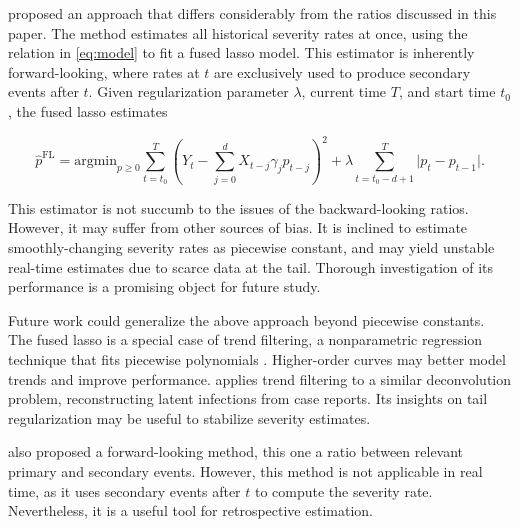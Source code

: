 \documentclass{article}
\renewcommand{\hat}{\widehat} %
\begin{document}

\citet{fusedlasso} proposed an approach that differs considerably from the ratios discussed in this paper. 
The method estimates all historical severity rates at once, using the relation in \eqref{eq:model} to fit a fused lasso model. This estimator is inherently forward-looking, where rates at $t$ are exclusively used to produce secondary events after $t$. Given regularization parameter $\lambda$, current time $T$, and start time $t_0$, the fused lasso estimates

$$\hat{p}^\text{FL} = \text{argmin}_{p \geq 0} \sum_{t=t_0}^T (Y_t-\sum_{j=0}^d X_{t-j}\gamma_j p_{t-j})^2 + \lambda\sum_{t=t_0-d+1}^{T}\lvert p_t - p_{t-1}\rvert.$$

This estimator is not succumb to the issues of the backward-looking ratios. However, it may suffer from other sources of bias. It is inclined to estimate smoothly-changing severity rates as piecewise constant, and may yield unstable real-time estimates due to scarce data at the tail. 
Thorough investigation of its performance is a promising object for future study.

Future work could generalize the above approach beyond piecewise constants. The fused lasso is a special case of trend filtering, a nonparametric regression technique that fits piecewise polynomials \citet{Tibshirani2014}. Higher-order curves may better model trends and improve performance. \citep{Jahja2022} applies trend filtering to a similar deconvolution problem, reconstructing latent infections from case reports. Its insights on tail regularization may be useful to stabilize severity estimates. 

\citet{UKpaper} also proposed a forward-looking method, this one a ratio between relevant primary and secondary events. However, this method is not applicable in real time, as it uses secondary events after $t$ to compute the severity rate. Nevertheless, it is a useful tool for retrospective estimation. 
\end{document}
